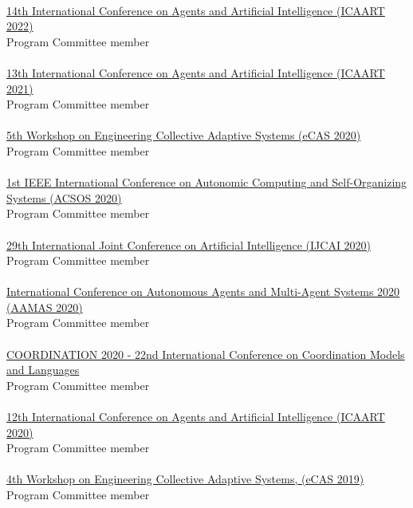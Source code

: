 \halfblankline \\
\href{http://www.icaart.org/?y=2022}{14th International Conference on Agents and Artificial Intelligence 
(ICAART 2022)}
\\ Program Committee member \\
\halfblankline \\
\href{http://www.icaart.org/?y=2021}{13th International Conference on Agents and Artificial Intelligence 
(ICAART 2021)}
\\ Program Committee member \\
\halfblankline \\
\href{http://archive.vn/wip/38Ah6}{5th Workshop on Engineering Collective Adaptive Systems (eCAS 2020)}
\\ Program Committee member \\
\halfblankline \\
\href{https://conf.researchr.org/home/acsos-2020}{1st IEEE International Conference on Autonomic Computing and Self-Organizing Systems (ACSOS 2020)}
\\ Program Committee member \\
\halfblankline \\
\href{https://https://ijcai20.org/}{29th International Joint Conference on Artificial Intelligence (IJCAI 2020)}
\\ Program Committee member \\
\halfblankline \\
\href{https://aamas2020.conference.auckland.ac.nz/program-committee-members/}{International Conference on Autonomous Agents and Multi-Agent Systems 2020 (AAMAS 2020)}
\\ Program Committee member \\
\halfblankline \\
\href{http://www.discotec.org/2020/coordination}{COORDINATION 2020 - 22nd International Conference on Coordination Models and Languages}
\\ Program Committee member \\
\halfblankline \\
\href{http://www.icaart.org/?y=2020}{12th International Conference on Agents and Artificial Intelligence 
(ICAART 2020)}
\\ Program Committee member \\
\halfblankline \\
\href{http://apice.unibo.it/xwiki/bin/view/ECAS2019/Committees}{4th Workshop on Engineering Collective Adaptive Systems, (eCAS 2019)}
\\ Program Committee member \\
